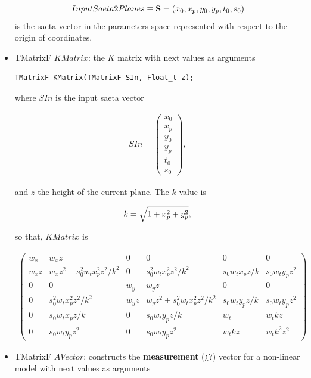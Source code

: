 \documentclass[a4paper]{book}
\let\vec\mathbf  %
\begin{document}
\begin{itemize}
	\begin{equation}
	\notag
	InputSaeta2Planes \equiv \vec{S} = (x_0, x_p, y_0, y_p, t_0, s_0)
	\end{equation}
	is the saeta vector in the parameters space represented with respect to the origin of coordinates.
	
	
	\item TMatrixF $KMatrix$: the $K$ matrix with next values as arguments
	
	\begin{lstlisting}
TMatrixF KMatrix(TMatrixF SIn, Float_t z);
	\end{lstlisting}
	
	where $SIn$ is the input saeta vector
	
	\begin{align*}
	SIn = \left(
	\begin{array}{c}
	x_0\\
	x_p\\
	y_0\\
	y_p\\
	t_0\\
	s_0
	\end{array} \right),
	\end{align*}
	
	and $z$ the height of the current plane. The $k$ value is
	
	\begin{equation}
	\notag
	k = \sqrt{1 + x_p^2 + y_p^2},
	\end{equation}
	
	so that, $KMatrix$ is
	
	\begin{align*}
	\left(
	\begin{array}{cccccc}
	w_x   & w_x z & 0 & 0 & 0 & 0\\
	w_x z & w_x z^2 + s_0^2 w_t x_p^2 z^2/k^2 & 0 & s_0^2 w_t x_p^2 z^2 /k^2 & s_0 w_t x_p z/k & s_0 w_t y_p z^2 \\
	0 & 0 & w_y & w_y z & 0 & 0\\
	0 & s_0^2 w_t x_p^2 z^2 /k^2 & w_y z & w_y z^2 + s_0^2 w_t x_p^2 z^2/k^2 & s_0 w_t y_p z/k & s_0 w_t y_p z^2\\
	0 & s_0 w_t x_p z/k & 0 & s_0 w_t y_p z/k & w_t & w_t k z\\
	0 & s_0 w_t y_p z^2 & 0 & s_0 w_t y_p z^2 & w_t k z & w_t k^2 z^2
	\end{array} \right)
	\end{align*}
	
	\item TMatrixF $AVector$: constructs the \textbf{measurement} (¿?) vector for a non-linear model with next values as arguments
	

\end{itemize}
\end{document}
